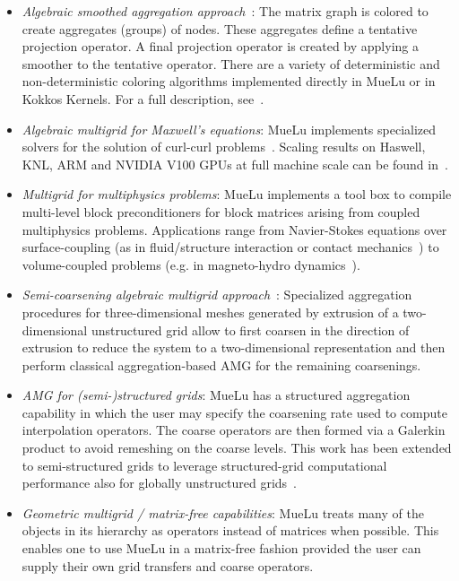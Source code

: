 \begin{itemize}
\item \emph{Algebraic smoothed aggregation approach}~\cite{Vanek1996a}:
The matrix graph is colored to create aggregates (groups) of nodes.
These aggregates define a tentative projection operator.
A final projection operator is created by applying a smoother to the tentative operator.
There are a variety of deterministic and non-deterministic coloring algorithms implemented directly
in MueLu or in Kokkos Kernels.  For a full description, see~\cite{BergerVergiat2023a}.

\item \emph{Algebraic multigrid for Maxwell's equations}:
  MueLu implements specialized solvers for the solution of curl-curl problems~\cite{BochevHuEtAl2008_AlgebraicMultigridApproachBased}.
  Scaling results on Haswell, KNL, ARM and NVIDIA V100 GPUs at full machine scale can be found in~\cite{BettencourtBrownEtAl2021_EmpirePic}.

\item \emph{Multigrid for multiphysics problems}:
MueLu implements a tool box to compile multi-level block preconditioners for block matrices arising from coupled multiphysics problems.
Applications range from Navier-Stokes equations
over surface-coupling (as in fluid/structure interaction or contact mechanics~\cite{Wiesner2021a})
to volume-coupled problems (e.g. in magneto-hydro dynamics~\cite{Ohm2022a}).

\item \emph{Semi-coarsening algebraic multigrid approach}~\cite{Tuminaro2016a}:
Specialized aggregation procedures for three-dimensional meshes generated by extrusion of a two-dimensional unstructured grid
allow to first coarsen in the direction of extrusion to reduce the system to a two-dimensional representation and then perform classical aggregation-based AMG
for the remaining coarsenings.

\item \emph{AMG for (semi-)structured grids}:
MueLu has a structured aggregation capability in which the user may specify the coarsening rate used to compute interpolation operators.
The coarse operators are then formed via a Galerkin product to avoid remeshing on the coarse levels.
This work has been extended to semi-structured grids to leverage structured-grid computational performance also for globally unstructured grids~\cite{Mayr2022a}.

\item \emph{Geometric multigrid / matrix-free capabilities}:
MueLu treats many of the objects in its hierarchy as operators instead of matrices when possible.
This enables one to use MueLu in a matrix-free fashion provided the user can supply their own grid transfers and coarse operators.

\end{itemize}

